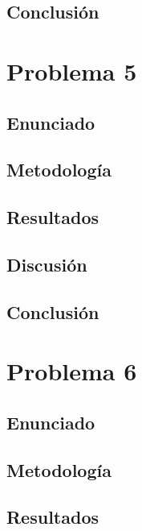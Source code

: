 \documentclass{article}
\begin{document}
\subsection{Conclusión}

\section{Problema 5}

\subsection{Enunciado}

\subsection{Metodología}

\subsection{Resultados}
\setcounter{equation}{0}

\subsection{Discusión}

\subsection{Conclusión}

\section{Problema 6}

\subsection{Enunciado}

\subsection{Metodología}

\subsection{Resultados}
\setcounter{equation}{0}
\end{document}
